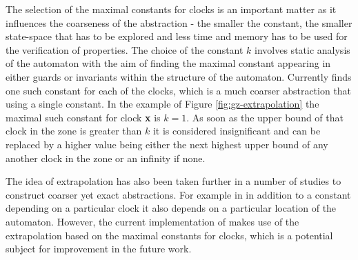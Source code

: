 The selection of the maximal constants for clocks is an important matter as it influences the coarseness of the abstraction - the smaller the constant, the smaller state-space that has to be explored and less time and memory has to be used for the  verification of properties. 
The choice of the constant $k$ involves static analysis of the automaton with the aim of finding the maximal constant appearing in either guards or invariants within the structure of the automaton. Currently \jecdar finds one such constant for each of the clocks, which is a much coarser abstraction that using a single constant. In the example of Figure \ref{fig:gz-extrapolation} the maximal such constant for clock \textbf{x} is $k = 1$. As soon as the upper bound of that clock in the zone is greater than $k$ it is considered insignificant and can be replaced by a higher value being either the next highest upper bound of any another clock in the zone or an infinity if none. 

The idea of extrapolation has also been taken further in a number of studies to construct coarser yet exact abstractions. For example in \textcite{StaticGuardAnalysis} in addition to a constant depending on a particular clock it also depends on a particular location of the automaton. However, the current implementation of \jecdar makes use of the extrapolation based on the maximal constants for clocks, which is a potential subject for improvement in the future work.